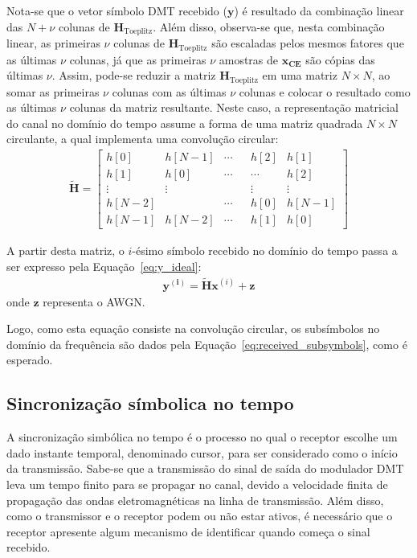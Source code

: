 Nota-se que o vetor símbolo DMT recebido ($\mathbf{y}$) é resultado da combinação linear das $N + \nu$ colunas de $\mathbf{H}_\text{Toeplitz}$. Além disso, observa-se que, nesta combinação linear, as primeiras $\nu$ colunas de $\mathbf{H}_\text{Toeplitz}$ são escaladas pelos mesmos fatores que as últimas $\nu$ colunas, já que as primeiras $\nu$ amostras de $\mathbf{x_\text{CE}}$ são cópias das últimas $\nu$. Assim, pode-se reduzir a matriz $\mathbf{H}_\text{Toeplitz}$ em uma matriz $N \times N$, ao somar as primeiras $\nu$ colunas com as últimas $\nu$ colunas e colocar o resultado como as últimas $\nu$ colunas da matriz resultante. Neste caso, a representação matricial do canal no domínio do tempo assume a forma de uma matriz quadrada $N \times N$ circulante, a qual implementa uma convolução circular:
\begin{align}
\mathbf{\tilde{H}}=
\left[
\begin{array}{cccccc}
h[0] & h[N-1] & \cdots & & h[2] & h[1]\\
h[1] & h[0] & \cdots &  &\cdots & h[2]\\
\vdots & \vdots & & & \vdots & \vdots\\
h[N-2] & & \cdots & & h[0] & h[N-1]\\
h[N-1] & h[N-2] & \cdots & & h[1] & h[0]
\end{array}
\right]
\label{eq:circ_h}
\end{align}

A partir desta matriz, o $i$-ésimo símbolo recebido no domínio do tempo passa a ser expresso pela Equação~\ref{eq:y_ideal}:
\begin{align}
\mathbf{y^{(i)}} = \mathbf{ \tilde{H} } \mathbf{x}^{(i)} + \mathbf{z}
\label{eq:y_ideal}
\end{align}
onde $\mathbf{z}$ representa o AWGN.

Logo, como esta equação consiste na convolução circular, os subsímbolos no domínio da frequência são dados pela Equação~\ref{eq:received_subsymbols}, como é esperado.

\subsection{Sincronização símbolica no tempo}
\label{subsec:sincronizacao}

A sincronização simbólica no tempo é o processo no qual o receptor escolhe um dado instante temporal, denominado cursor, para ser considerado como o início da transmissão. Sabe-se que a transmissão do sinal de saída do modulador DMT leva um tempo finito para se propagar no canal, devido a velocidade finita de propagação das ondas eletromagnéticas na linha de transmissão. Além disso, como o transmissor e o receptor podem ou não estar ativos, é necessário que o receptor apresente algum mecanismo de identificar quando começa o sinal recebido. 

